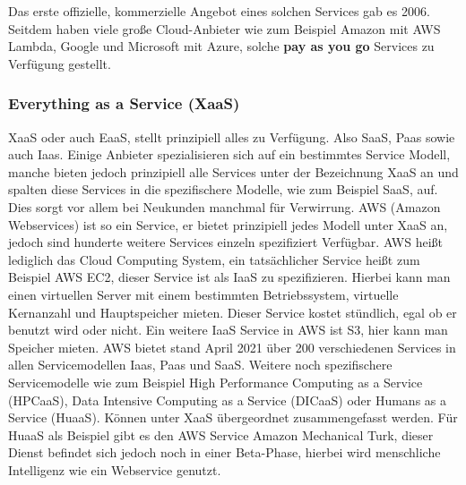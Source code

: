 Das erste offizielle, kommerzielle Angebot eines solchen Services gab es 2006. Seitdem haben viele große Cloud-Anbieter wie zum Beispiel Amazon mit AWS Lambda, Google und Microsoft mit Azure, solche \textbf{pay as you go} Services zu Verfügung gestellt.


\subsubsection{Everything as a Service (XaaS)}
XaaS oder auch EaaS, stellt prinzipiell alles zu Verfügung. Also SaaS, Paas sowie auch Iaas. Einige Anbieter spezialisieren sich auf ein bestimmtes Service Modell, manche bieten jedoch prinzipiell alle Services unter der Bezeichnung XaaS an und spalten diese Services in die spezifischere Modelle, wie zum Beispiel SaaS, auf. Dies sorgt vor allem bei Neukunden manchmal für Verwirrung. AWS (Amazon Webservices) ist so ein Service, er bietet prinzipiell jedes Modell unter XaaS an, jedoch sind hunderte weitere Services einzeln spezifiziert Verfügbar. AWS heißt lediglich das Cloud Computing System, ein tatsächlicher Service heißt zum Beispiel AWS EC2, dieser Service ist als IaaS zu spezifizieren. Hierbei kann man einen virtuellen Server mit einem bestimmten Betriebssystem, virtuelle Kernanzahl und Hauptspeicher mieten. Dieser Service kostet stündlich, egal ob er benutzt wird oder nicht. Ein weitere IaaS Service in AWS ist S3, hier kann man Speicher mieten.\newline
AWS bietet stand April 2021 über 200 verschiedenen Services in allen Servicemodellen Iaas, Paas und SaaS.
\newline
Weitere noch spezifischere Servicemodelle wie zum Beispiel High Performance Computing as a Service (HPCaaS), Data Intensive Computing as a Service (DICaaS) oder Humans as a Service (HuaaS). Können unter XaaS übergeordnet zusammengefasst werden. Für HuaaS als Beispiel gibt es den AWS Service Amazon Mechanical Turk, dieser Dienst befindet sich jedoch noch in einer Beta-Phase, hierbei wird menschliche Intelligenz wie ein Webservice genutzt.

